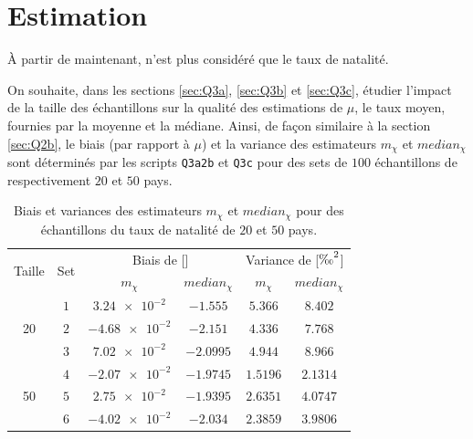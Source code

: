 \documentclass[a4paper, 12pt]{article}
\def\ptsd{\textperthousand}
\begin{document}
	\section{Estimation} \label{sec:Q3}
	À partir de maintenant, n'est plus considéré que le taux de natalité. \par
	On souhaite, dans les sections \ref{sec:Q3a}, \ref{sec:Q3b} et \ref{sec:Q3c}, étudier l'impact de la taille des échantillons sur la qualité des estimations de $\mu$, le taux moyen, fournies par la moyenne et la médiane. Ainsi, de façon similaire à la section \ref{sec:Q2b}, le biais (par rapport à $\mu$) et la variance des estimateurs $m_{\chi}$ et $median_{\chi}$ sont déterminés par les scripts \texttt{Q3a2b} et \texttt{Q3c} pour des sets de $100$ échantillons de respectivement $20$ et $50$ pays. \par
	\begin{table}[h]
		\centering
		\begin{tabular}{|c|c|c|c|c|c|}
			\hline
			\multirow{2}{*}{Taille} & \multirow{2}{*}{Set} & \multicolumn{2}{c|}{Biais de [\ptsd]} & \multicolumn{2}{c|}{Variance de [$\text{\ptsd}^2$]} \\ \cline{3-6}
			                        &                      &    $m_{\chi}$    &  $median_{\chi}$   &   $m_{\chi}$   &           $median_{\chi}$           \\ \hline\hline
			  \multirow{3}{*}{20}   &         $1$          & $\num{3.24e-2}$  &   $\num{-1.555}$   & $\num{5.366}$  &            $\num{8.402}$            \\ \cline{2-6}
			                        &         $2$          & $\num{-4.68e-2}$ &   $\num{-2.151}$   & $\num{4.336}$  &            $\num{7.768}$            \\ \cline{2-6}
			                        &         $3$          & $\num{7.02e-2}$  &  $\num{-2.0995}$   & $\num{4.944}$  &            $\num{8.966}$            \\ \hline\hline
			  \multirow{3}{*}{50}   &         $4$          & $\num{-2.07e-2}$ &  $\num{-1.9745}$   & $\num{1.5196}$ &           $\num{2.1314}$            \\ \cline{2-6}
			                        &         $5$          & $\num{2.75e-2}$  &  $\num{-1.9395}$   & $\num{2.6351}$ &           $\num{4.0747}$            \\ \cline{2-6}
			                        &         $6$          & $\num{-4.02e-2}$ &   $\num{-2.034}$   & $\num{2.3859}$ &           $\num{3.9806}$            \\ \hline
		\end{tabular}
		\caption{Biais et variances des estimateurs $m_{\chi}$ et $median_{\chi}$ pour des échantillons du taux de natalité de $20$ et $50$ pays.}
		\label{table:Q3}
	\end{table}
\end{document}
